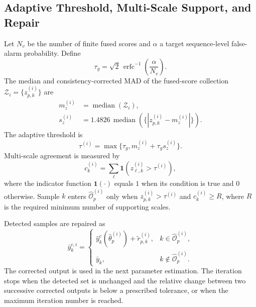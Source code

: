 \documentclass[journal]{IEEEtran}
\newcommand{\med}{\operatorname{median}}
\newcommand{\ind}{\mathbf{1}}
\newcommand{\Oh}{\widehat{\mathcal O}}
\begin{document}
\subsection{Adaptive Threshold, Multi-Scale Support, and Repair}
Let $N_v$ be the number of finite fused scores and $\alpha$ a target sequence-level false-alarm probability. Define
\begin{equation}
\tau_g=\sqrt 2\,\operatorname{erfc}^{-1}\!\left(\frac{\alpha}{N_v}\right).
\end{equation}
The median and consistency-corrected MAD of the fused-score collection $\mathcal Z_i=\{z_{p,k}^{(i)}\}$ are
\begin{align}
m_z^{(i)}&=\med(\mathcal Z_i),\\
s_z^{(i)}&=1.4826\,\med\left(\{|z_{p,k}^{(i)}-m_z^{(i)}|\}\right).
\end{align}
The adaptive threshold is
\begin{equation}
\tau^{(i)}=\max\{\tau_g,m_z^{(i)}+\tau_gs_z^{(i)}\}.
\end{equation}
Multi-scale agreement is measured by
\begin{equation}
c_k^{(i)}=\sum_{\ell}\ind\!\left(z_{\ell,k}^{(i)}>\tau^{(i)}\right),
\end{equation}
where the indicator function $\ind(\cdot)$ equals $1$ when its condition is true and $0$ otherwise. Sample $k$ enters $\Oh_p^{(i)}$ only when $z_{p,k}^{(i)}>\tau^{(i)}$ and $c_k^{(i)}\ge R$, where $R$ is the required minimum number of supporting scales.

Detected samples are repaired as
\begin{equation}
\bar y_k^{c,i}=\begin{cases}
\hat y_k^{c}(\hat\theta_p^{(i)})+\tilde r_{p,k}^{(i)},&k\in\Oh_p^{(i)},\\
\bar y_k,&k\notin\Oh_p^{(i)}.
\end{cases}
\end{equation}
The corrected output is used in the next parameter estimation. The iteration stops when the detected set is unchanged and the relative change between two successive corrected outputs is below a prescribed tolerance, or when the maximum iteration number is reached.
\end{document}
